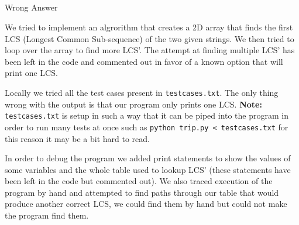 \documentclass[11pt, letterpaper]{article}
\newcommand{\code}[1]{\colorbox{codebg}{\textcolor{codefg}{\texttt{#1}}}}
\begin{document}
\\
\\
\noindent{\today}\\
\\

\smallskip
{}

Wrong Answer

\bigskip
{}

We tried to implement an algrorithm that creates a 2D array that finds the first LCS (Longest Common Sub-sequence) of the two given strings. We then tried to loop over the array to find more LCS'. The attempt at finding multiple LCS' has been left in the code and commented out in favor of a known option that will print one LCS.

\bigskip
{}

Locally we tried all the test cases present in \code{testcases.txt}. The only thing wrong with the output is that our program only prints one LCS. \textbf{Note:} \code{testcases.txt} is setup in such a way that it can be piped into the program in order to run many tests at once such as \code{python trip.py < testcases.txt} for this reason it may be a bit hard to read.

\bigskip
{}

In order to debug the program we added print statements to show the values of some variables and the whole table used to lookup LCS' (these statements have been left in the code but commented out). We also traced execution of the program by hand and attempted to find paths through our table that would produce another correct LCS, we could find them by hand but could not make the program find them.
\end{document}
